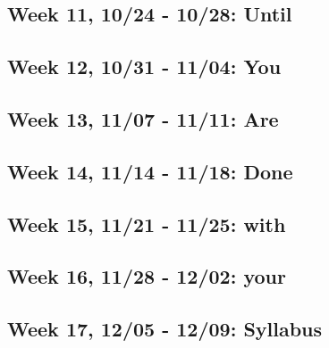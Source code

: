 \documentclass[
      12pt,
        ]{article}
\begin{document}
\hypertarget{week-11-1024---1028-until}{%
\subsection{Week 11, 10/24 - 10/28:
Until}\label{week-11-1024---1028-until}}

\hypertarget{week-12-1031---1104-you}{%
\subsection{Week 12, 10/31 - 11/04: You}\label{week-12-1031---1104-you}}

\hypertarget{week-13-1107---1111-are}{%
\subsection{Week 13, 11/07 - 11/11: Are}\label{week-13-1107---1111-are}}

\hypertarget{week-14-1114---1118-done}{%
\subsection{Week 14, 11/14 - 11/18:
Done}\label{week-14-1114---1118-done}}

\hypertarget{week-15-1121---1125-with}{%
\subsection{Week 15, 11/21 - 11/25:
with}\label{week-15-1121---1125-with}}

\hypertarget{week-16-1128---1202-your}{%
\subsection{Week 16, 11/28 - 12/02:
your}\label{week-16-1128---1202-your}}

\hypertarget{week-17-1205---1209-syllabus}{%
\subsection{Week 17, 12/05 - 12/09:
Syllabus}\label{week-17-1205---1209-syllabus}}
\end{document}
